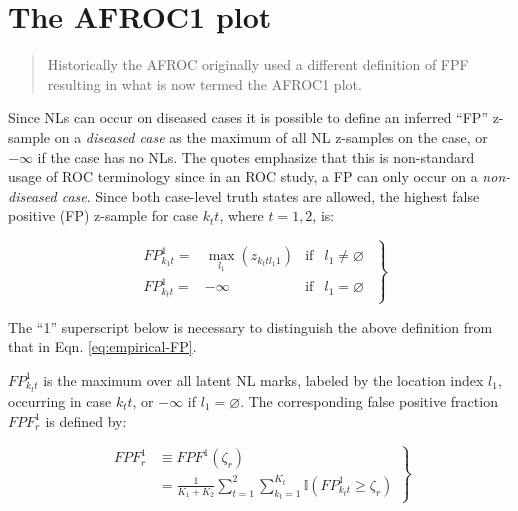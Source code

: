 \documentclass[
]{book}
\begin{document}
\hypertarget{empirical-AFROC1}{%
\section{The AFROC1 plot}\label{empirical-AFROC1}}

\begin{quote}
Historically the AFROC originally used a different definition of FPF resulting in what is now termed the AFROC1 plot.
\end{quote}

Since NLs can occur on diseased cases it is possible to define an inferred ``FP'' z-sample on a \emph{diseased case} as the maximum of all NL z-samples on the case, or \(-\infty\) if the case has no NLs. The quotes emphasize that this is non-standard usage of ROC terminology since in an ROC study, a FP can only occur on a \emph{non-diseased case}. Since both case-level truth states are allowed, the highest false positive (FP) z-sample for case \(k_t t\), where \(t = 1,2\), is:

\begin{equation}
\left.
\begin{aligned}
\begin{matrix}
FP_{k_1 t}^1=&\max_{l_1} \left ( z_{k_t t l_1 1 } \right ) & \text{if} & l_1 \neq \varnothing\\
FP_{k_t t}^1=&-\infty & \text{if} & l_1 = \varnothing
\end{matrix}
\end{aligned}
\right \}
\label{eq:empirical-FP1}
\end{equation}

The ``1'' superscript below is necessary to distinguish the above definition from that in Eqn. \eqref{eq:empirical-FP}.

\(FP_{k_t t}^1\) is the maximum over all latent NL marks, labeled by the location index \(l_1\), occurring in case \(k_t t\), or \(-\infty\) if \(l_1 = \varnothing\). The corresponding false positive fraction \(FPF_r^1\) is defined by:

\begin{equation}
\left.
\begin{aligned}
FPF_r^1 
&\equiv FPF^1\left ( \zeta_r \right ) \\
&= \frac{1}{K_1+K_2}\sum_{t=1}^{2}\sum_{k_t=1}^{K_t} \mathbb{I}\left ( FP_{k_t t}^1 \geq \zeta_r \right )
\end{aligned}
\right \}
\label{eq:empirical-fpf1}
\end{equation}
\end{document}

